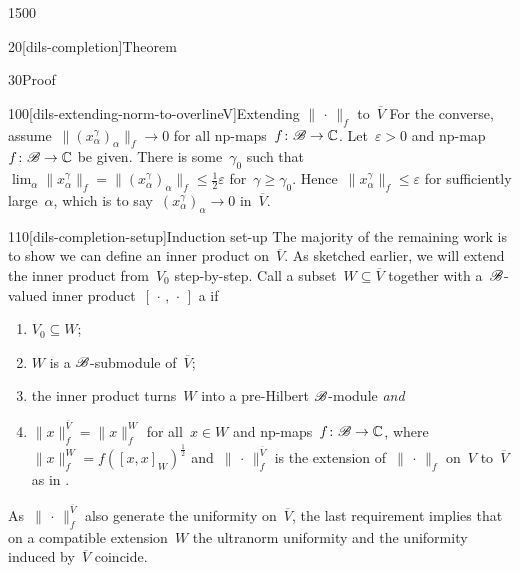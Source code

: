 \begin{parsec}{1500}
\begin{point}{20}[dils-completion]{Theorem}
\begin{point}{30}{Proof}
\begin{point}{100}[dils-extending-norm-to-overlineV]{Extending $\|\,\cdot\,\|_f$ to~$\overline{V}$}
For the converse, assume~$\|(x^\gamma_\alpha)_\alpha\|_f \to 0$
    for all np-maps~$f\colon \mathscr{B} \to \mathbb{C}$.
Let~$\varepsilon > 0$ and np-map~$f\colon \mathscr{B} \to \mathbb{C}$ be given.
There is some~$\gamma_0$ such that
$\lim_\alpha \|x^\gamma_\alpha \|_f = \|(x^\gamma_\alpha)_\alpha\|_f
\leq \frac{1}{2}\varepsilon$
for~$\gamma\geq\gamma_0$.
Hence~$\|x^\gamma_\alpha\|_f \leq \varepsilon$
    for sufficiently large~$\alpha$,
    which is to say~$(x^\gamma_\alpha)_\alpha \to 0$ in~$\overline{V}$.
\end{point}
\begin{point}{110}[dils-completion-setup]{Induction set-up}%
The majority of the remaining work is to show
    we can define an inner product on~$\overline{V}$.
As sketched earlier,
    we will extend the inner product
    from~$V_0$ step-by-step.
Call a subset~$W \subseteq \overline{V}$
together with a~$\mathscr{B}$-valued inner product~$[\,\cdot\,,\,\cdot\,]$ a
 if
\begin{enumerate}
\item $V_0 \subseteq W$;
\item $W$ is a $\mathscr{B}$-submodule of~$\overline{V}$;
\item the inner product turns~$W$ into a pre-Hilbert $\mathscr{B}$-module \emph{and}
\item $\|x\|_f^{\overline{V}} = \|x\|_f^W$
        for all~$x \in W$
        and np-maps~$f\colon \mathscr{B} \to \mathbb{C}$,
        where~$\|x\|_f^W = f([x,x]_W)^{\frac{1}{2}}$
        and~$\|\,\cdot\,\|^{\overline{V}}_f$
        is the extension of~$\|\,\cdot\,\|_f$
        on~$V$ to~$\overline{V}$
        as in .
\end{enumerate}
As~$\|\,\cdot\,\|^{\overline{V}}_f$ also
    generate the uniformity on~$\overline{V}$,
    the last requirement implies
    that on a compatible extension~$W$
    the ultranorm uniformity and
    the uniformity induced by~$\overline{V}$
    coincide.


\end{point}
\end{point}
\end{point}
\end{parsec}
